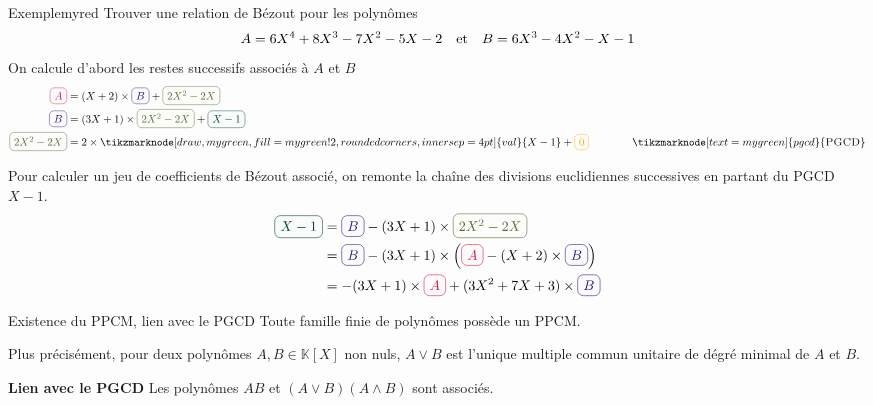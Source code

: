     \begin{omed}{Exemple}{myred}
        Trouver une relation de Bézout pour les polynômes 
        \[ A = 6X^4 + 8 X^3 - 7X^2 - 5X -2 \quad \text{et} \quad B = 6X^3 - 4X^2 - X -1 \]   
        On calcule d’abord les restes successifs associés à $A$ et $B$ 
            \begin{align*}
                \lilbox{myred}{$A$} &= (X + 2) \times \lilbox{mypurple}{$B$} + \lilbox{myolive}{$2X^2 - 2X$} \\
                \lilbox{mypurple}{$B$} &= (3X + 1) \times \lilbox{myolive}{$2X^2 - 2X$} + \lilbox{mygreen}{$X - 1$} \\
                \lilbox{myolive}{$2X^2 - 2X$} &= 2 \times \tikzmarknode[draw, mygreen, fill = mygreen!2, rounded corners, inner sep=4pt]{val}{X-1} 
                + \lilbox{myyellow}{$0$} \qquad \qquad  \tikzmarknode[text=mygreen]{pgcd}{\textsc{PGCD}}
            \end{align*}
        Pour calculer un jeu de coefficients de Bézout associé, on remonte la chaîne des divisions euclidiennes successives en partant du PGCD $X-1$.
        \begin{align*}
            \lilbox{mygreen}{$X - 1$} &= \lilbox{mypurple}{$B$} - (3X + 1) \times \lilbox{myolive}{$2X^2 - 2X$} \\
            &= \lilbox{mypurple}{$B$} - (3X + 1) \times \left(\lilbox{myred}{$A$} - (X+2) \times \lilbox{mypurple}{$B$} \right) \\
            &= - (3X + 1) \times \lilbox{myred}{$A$} + (3X^2 + 7X + 3) \times \lilbox{mypurple}{$B$}
        \end{align*}
    \end{omed}

    \begin{theo}{Existence du PPCM, lien avec le PGCD}{}
        Toute famille finie de polynômes possède un PPCM.

        Plus précisément, pour deux polynômes $A,B \in \mathbb{K}[X]$ non nuls, $A \vee B$ est l’unique multiple commun unitaire de dégré minimal de $A$ et $B$.

        \textbf{Lien avec le PGCD} \quad Les polynômes $AB$ et $(A \vee B)(A \wedge B)$ sont associés.
    \end{theo}

